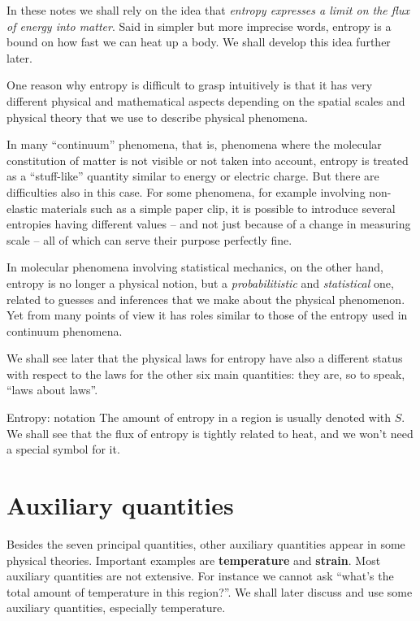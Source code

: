 \documentclass[a4paper,12pt,%
onecolumn,oneside,%
british%
]{memoir}
\renewcommand*{\|}[1][]{\nonscript\:#1\vert\nonscript\:\mathopen{}}
\newcommand*{\yS}{S}
\begin{document}
In these notes we shall rely on the idea that \emph{entropy expresses a limit on the flux of energy into matter}. Said in simpler but more imprecise words, entropy is a bound on how fast we can heat up a body. We shall develop this idea further later.

One reason why entropy is difficult to grasp intuitively is that it has very different physical and mathematical aspects depending on the spatial scales and physical theory that we use to describe physical phenomena.

In many \enquote{continuum} phenomena, that is, phenomena where the molecular constitution of matter is not visible or not taken into account, entropy is treated as a \enquote{stuff-like} quantity similar to energy or electric charge. But there are difficulties also in this case. For some phenomena, for example involving non-elastic materials such as a simple paper clip, it is possible to introduce several entropies having different values -- and not just because of a change in measuring scale -- all of which can serve their purpose perfectly fine.

In molecular phenomena involving statistical mechanics, on the other hand, entropy is no longer a physical notion, but a \emph{probabilitistic} and \emph{statistical} one, related to guesses and inferences that we make about the physical phenomenon. Yet from many points of view it has roles similar to those of the entropy used in continuum phenomena.

We shall see later that the physical laws for entropy have also a different status with respect to the laws for the other six main quantities: they are, so to speak, \enquote{laws about laws}.

\smallskip

\begin{definition}{Entropy: notation}
  The amount of entropy in a region is usually denoted with $\yS$. We shall see that the flux of entropy is tightly related to heat, and we won't need a special symbol for it.
\end{definition}


\section{Auxiliary quantities}
\label{sec:aux_quantities}

Besides the seven principal quantities, other auxiliary quantities appear in some physical theories. Important examples are \textbf{temperature} and \textbf{strain}. Most auxiliary quantities are not extensive. For instance we cannot ask \enquote{what's the total amount of temperature in this region?}. We shall later discuss and use some auxiliary quantities, especially temperature.
\end{document}
